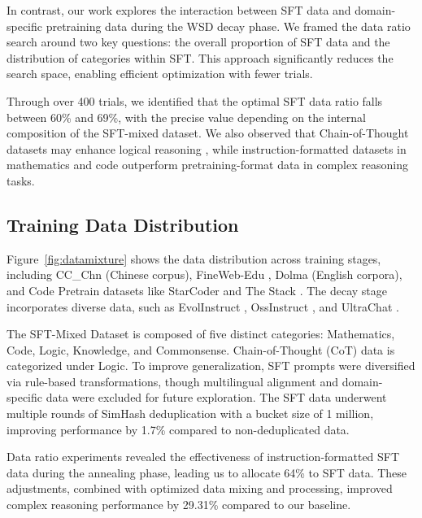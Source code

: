 \documentclass{article}
\begin{document}
In contrast, our work explores the interaction between SFT data and domain-specific pretraining data during the WSD decay phase. We framed the data ratio search around two key questions: the overall proportion of SFT data and the distribution of categories within SFT. This approach significantly reduces the search space, enabling efficient optimization with fewer trials.

Through over 400 trials, we identified that the optimal SFT data ratio falls between 60\% and 69\%, with the precise value depending on the internal composition of the SFT-mixed dataset. We also observed that Chain-of-Thought datasets may enhance logical reasoning \cite{suzgun2022challengingbigbenchtaskschainofthought}, while instruction-formatted datasets in mathematics and code outperform pretraining-format data in complex reasoning tasks.

\subsection{Training Data Distribution}

Figure~\ref{fig:datamixture} shows the data distribution across training stages, including CC\_Chn (Chinese corpus), FineWeb-Edu \citep{penedo2024fineweb}, Dolma \citep{soldaini2024dolma} (English corpora), and Code Pretrain datasets like StarCoder \citep{li2023starcoder} and The Stack \citep{kocetkov2022stack}. The decay stage incorporates diverse data, such as EvolInstruct \citep{xu2023EvolInstruct}, OssInstruct \citep{wei2024OssInstruct}, and UltraChat \citep{ding2023UltraChat}.

The SFT-Mixed Dataset is composed of five distinct categories: Mathematics, Code, Logic, Knowledge, and Commonsense. Chain-of-Thought (CoT) data is categorized under Logic. To improve generalization, SFT prompts were diversified via rule-based transformations, though multilingual alignment and domain-specific data were excluded for future exploration. The SFT data underwent multiple rounds of SimHash deduplication with a bucket size of 1 million, improving performance by 1.7\% compared to non-deduplicated data.

Data ratio experiments revealed the effectiveness of instruction-formatted SFT data during the annealing phase, leading us to allocate 64\% to SFT data. These adjustments, combined with optimized data mixing and processing, improved complex reasoning performance by 29.31\% compared to our baseline.
\end{document}
